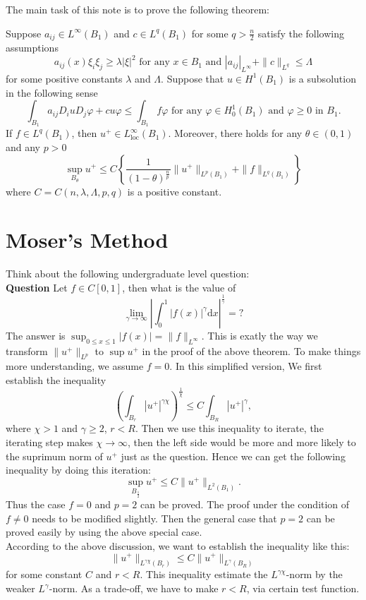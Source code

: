 The main task of this note is to prove the following theorem:
\begin{theorem}
 Suppose $a_{ij}\in L^{\infty}(B_1)$ and $c\in L^{q}(B_1)$ for some $q>\frac{n}{2}$ satisfy the following assumptions
  \[
    a_{ij}(x)\xi_i\xi_j\ge \lambda \left| \xi \right| ^{2}\text{ for any }x\in B_1 \text{ and }\left| a_{ij} \right| _{L^{\infty}}+\|c\|_{L^{q}}\le \Lambda
  \] 
  for some positive constants $\lambda$ and $\Lambda$. Suppose that  $u\in H^{1}(B_1)$ is a subsolution in the following sense
  \[
    \int_{B_1}a_{ij}D_iuD_j\varphi+cu\varphi\le \int_{B_1}f\varphi \text{ for any }\varphi \in H_0^{1}(B_1) \text{ and } \varphi\ge 0 \text{ in }B_1.
  \] 
  If $f\in L^{q}(B_1)$, then $u^{+}\in L_{\mathrm{loc}}^{\infty}(B_1)$. Moreover, there holds for any $\theta \in  (0,1)$ and any $p>0$ 
  \[
    \sup_{B_{\theta}}u^{+}\le C\left\lbrace \frac{1}{(1-\theta)^{\frac{n}{p}}}\|u^{+}\|_{L^{p}(B_1)}+\|f\|_{L^{q}(B_1)}  \right\rbrace
  \]
  where $C=C(n,\lambda,\Lambda,p,q)$ is a positive constant.
\end{theorem}
\section{Moser's Method}
Think about the following undergraduate level question:\\
{\textbf{Question}} Let $f\in C[0,1]$, then what is the value of 
  \[
    \lim_{\gamma \to \infty}\left|\int_0^1 \left| f(x) \right|^{\gamma}\mathrm{d}x\right|^{\frac{1}{\gamma}}=?
  \]
  The answer is $\sup_{0\le x\le 1}\left| f(x) \right|=\|f\|_{L^{\infty}}$.
This is exatly the way we transform  $\|u^{+}\|_{L^{p}}$ to  $\sup u^{+}$ in the proof of the  above theorem. To make things more understanding, we assume $f=0$. In this simplified version, We first establish the inequality
   \[
     \left( \int_{B_r}\left| u^{+} \right| ^{\gamma\chi} \right)^{\frac{1}{\chi}}\le C\int_{B_R}\left| u^{+} \right|^{\gamma},  
   \]  
   where $\chi>1$ and $\gamma\ge 2$, $r<R$. Then we use this inequality to iterate, the iterating step makes  $\chi\to \infty$, then the left side would be more and more likely to the suprimum norm of $u^{+}$ just as the question. Hence we can get the following inequality by doing this iteration:
   \[
     \sup_{B_{\frac{1}{2}}}u^{+}\le C \|u^{+}\|_{L^{2}(B_1)} .
   \] 
Thus the case $f=0$ and $p=2$ can be proved. The proof under the  condition of $f\neq 0$ needs to be modified slightly.
Then the general case that $p= 2$ can be proved easily by using the above special case.\\
According to the above discussion, we want to establish the inequality like this: 
\[
  \|u^{+}\|_{L^{\gamma\chi}(B_r)}\le C\|u^{+}\|_{L^{\gamma}(B_R)}
\] 
for some constant $C$ and $r<R$. This inequality estimate the  $L^{\gamma\chi}$-norm by the weaker $L^{\gamma}$-norm. As a trade-off, we have to make $r<R$, via certain test function. 

